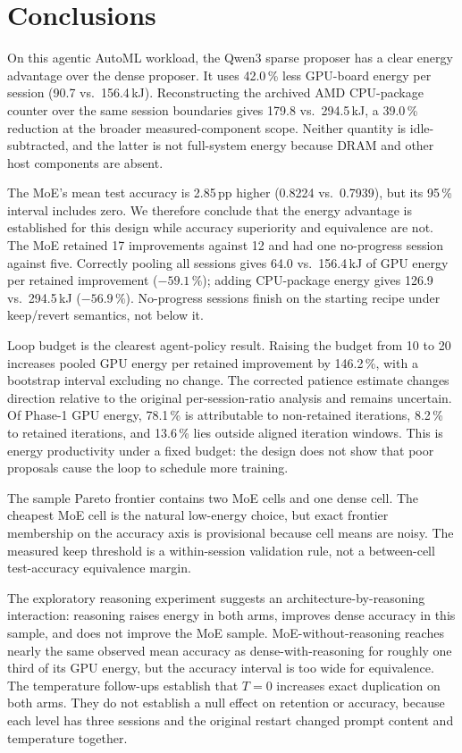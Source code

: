 \section{Conclusions}\label{sec:conclusions}

On this agentic AutoML workload, the Qwen3 sparse proposer has a clear energy
advantage over the dense proposer. It uses 42.0\,\% less GPU-board energy per
session (90.7 vs.\ 156.4\,kJ). Reconstructing the archived AMD CPU-package
counter over the same session boundaries gives 179.8 vs.\ 294.5\,kJ, a 39.0\,\%
reduction at the broader measured-component scope. Neither quantity is idle-
subtracted, and the latter is not full-system energy because DRAM and other host
components are absent.

The MoE's mean test accuracy is 2.85\,pp higher (0.8224 vs.\ 0.7939), but its
95\,\% interval includes zero. We therefore conclude that the energy advantage is
established for this design while accuracy superiority and equivalence are not.
The MoE retained 17 improvements against 12 and had one no-progress session
against five. Correctly pooling all sessions gives 64.0 vs.\ 156.4\,kJ of GPU
energy per retained improvement ($-59.1\,\%$); adding CPU-package energy gives
126.9 vs.\ 294.5\,kJ ($-56.9\,\%$). No-progress sessions finish on the starting
recipe under keep/revert semantics, not below it.

Loop budget is the clearest agent-policy result. Raising the budget from 10 to 20
increases pooled GPU energy per retained improvement by 146.2\,\%, with a
bootstrap interval excluding no change. The corrected patience estimate changes
direction relative to the original per-session-ratio analysis and remains
uncertain. Of Phase-1 GPU energy, 78.1\,\% is attributable to non-retained
iterations, 8.2\,\% to retained iterations, and 13.6\,\% lies outside aligned
iteration windows. This is energy productivity under a fixed budget: the design
does not show that poor proposals cause the loop to schedule more training.

The sample Pareto frontier contains two MoE cells and one dense cell. The cheapest
MoE cell is the natural low-energy choice, but exact frontier membership on the
accuracy axis is provisional because cell means are noisy. The measured keep
threshold is a within-session validation rule, not a between-cell test-accuracy
equivalence margin.

The exploratory reasoning experiment suggests an architecture-by-reasoning
interaction: reasoning raises energy in both arms, improves dense accuracy in
this sample, and does not improve the MoE sample. MoE-without-reasoning reaches
nearly the same observed mean accuracy as dense-with-reasoning for roughly one
third of its GPU energy, but the accuracy interval is too wide for equivalence.
The temperature follow-ups establish that $T=0$ increases exact duplication on
both arms. They do not establish a null effect on retention or accuracy, because
each level has three sessions and the original restart changed prompt content and
temperature together.

